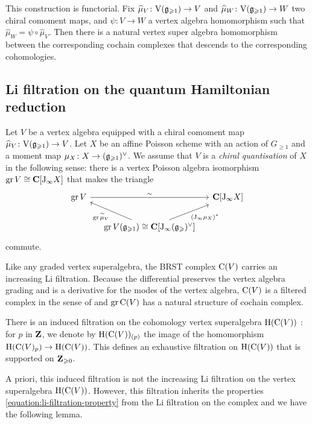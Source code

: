 This construction is functorial. Fix $\widehat{\mu}_V \colon \mathrm V(\mathfrak g_{\geqslant 1}) \rightarrow V$ and $\widehat{\mu}_W \colon \mathrm V(\mathfrak g_{\geqslant 1}) \rightarrow W$  two chiral comoment maps, and $\psi \colon V \rightarrow W$ a vertex algebra homomorphism such that $\widehat{\mu}_W = \psi \circ \widehat{\mu}_V$. Then there is a natural vertex super algebra homomorphism between the corresponding cochain complexes that descends to the corresponding cohomologies. 

\subsection{Li filtration on the quantum Hamiltonian reduction}

Let $V$ be a vertex algebra equipped with a chiral comoment map $\widehat{\mu}_V \colon \mathrm V(\mathfrak g_{\geqslant 1}) \rightarrow V$. Let $X$ be an affine Poisson scheme with an action of $G_{\geqslant 1}$ and a moment map $\mu_X\colon X \rightarrow (\mathfrak g_{\geqslant 1})^\vee$. We assume that $V$ is a \emph{chiral quantisation} of $X$ in the following sense: there is a vertex Poisson algebra isomorphism $\operatorname{gr} V \cong \mathbf{C}[\mathrm{J}_\infty X]$ that makes the triangle
\[ \begin{tikzcd}[column sep = small]
	\gr V \arrow[rr, "\sim"] &  & \C[\J_\infty X] \\
	& \arrow[lu, "\gr \widetilde{\mu}_V"] \arrow[ru, "(\J_\infty \mu_X)^*"'] \gr V(\g_{\geqslant 1})\cong \C[\J_\infty (\g_{\geqslant})^\vee]  &
\end{tikzcd} \]
commute.

Like any graded vertex superalgebra, the BRST complex $\mathrm{C}(V)$ carries an increasing Li filtration. Because the differential preserves the vertex algebra grading and is a derivative for the modes of the vertex algebra, $\mathrm{C}(V)$ is a filtered complex in the sense of \cite[Section 5.4]{weibel1994introduction} and $\operatorname{gr} \mathrm{C}(V)$ has a natural structure of cochain complex.

There is an induced filtration on the cohomology vertex superalgebra $\mathrm{H}(\mathrm{C}(V))$ \cite[Section 5.5]{weibel1994introduction}: for $p$ in $\mathbf{Z}$, we denote by $\mathrm{H}(\mathrm{C}(V))_{(p)}$ the image of the homomorphism $\mathrm{H}(\mathrm{C}(V)_p) \rightarrow \mathrm{H}(\mathrm{C}(V))$. This defines an exhaustive filtration on $\mathrm{H}(\mathrm{C}(V))$ that is supported on $\mathbf{Z}_{\geqslant 0}$. 

A priori, this induced filtration is not the increasing Li filtration on the vertex superalgebra $\mathrm{H}(\mathrm{C}(V))$. However, this filtration inherits the properties \eqref{equation:li-filtration-property} from the Li filtration on the complex and we have the following lemma.

